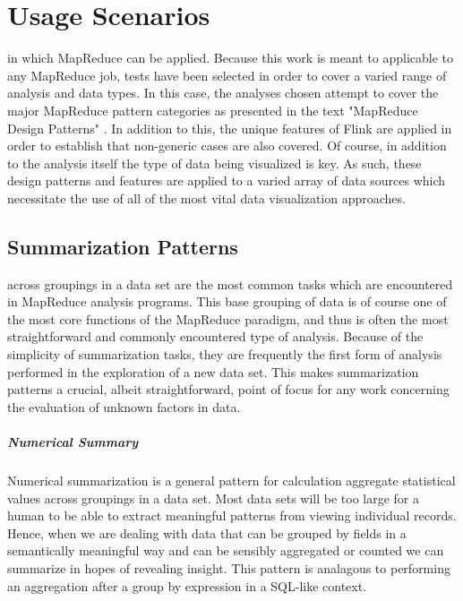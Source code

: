 \chapter{Usage Scenarios}
\label{sec:usagescenarios}
 in which MapReduce can be applied. Because this work is meant to applicable to any MapReduce job, tests have been selected in order to cover a varied range of analysis and data types. In this case, the analyses chosen attempt to cover the major MapReduce pattern categories as presented in the text "MapReduce Design Patterns" \cite{Miner2012}. In addition to this, the unique features of Flink are applied in order to establish that non-generic cases are also covered. Of course, in addition to the analysis itself the type of data being visualized is key. As such, these design patterns and features are applied to a varied array of data sources which necessitate the use of all of the most vital data visualization approaches.

\section{Summarization Patterns}
\label{sec:summarization}
 across groupings in a data set are the most common tasks which are encountered in MapReduce analysis programs. This base grouping of data is of course one of the most core functions of the MapReduce paradigm, and thus is often the most straightforward and commonly encountered type of analysis. Because of the simplicity of summarization tasks, they are frequently the first form of analysis performed in the exploration of a new data set. This makes summarization patterns a crucial, albeit straightforward, point of focus for any work concerning the evaluation of unknown factors in data.

\paragraph{Numerical Summary}
Numerical summarization is a general pattern for calculation aggregate statistical values across groupings in a data set. Most data sets will be too large for a human to be able to extract meaningful patterns from viewing individual records. Hence, when we are dealing with data that can be grouped by fields in a semantically meaningful way and can be sensibly aggregated or counted we can summarize in hopes of revealing insight. This pattern is analagous to performing an aggregation after a group by expression in a SQL-like context.

